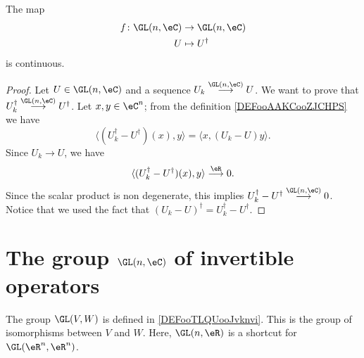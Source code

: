 \begin{lemma}        \label{LEMooZILJooFfDEAF}
	The map
	\begin{equation}
		\begin{aligned}
			f\colon \GL(n,\eC) & \to \GL(n,\eC)   \\
			U                  & \mapsto U^{\dag}
		\end{aligned}
	\end{equation}
	is continuous.
\end{lemma}

\begin{proof}
	Let \( U\in\GL(n,\eC)\) and a sequence \( U_k\stackrel{\GL(n,\eC)}{\longrightarrow}U\). We want to prove that \( U_k^{\dag}\stackrel{\GL(n,\eC)}{\longrightarrow}U^{\dag}\). Let \( x,y\in \eC^n\); from the definition \ref{DEFooAAKCooZJCHPS} we have
	\begin{equation}
		\langle (U_k^{\dag}-U^{\dag})(x),y \rangle =\langle x, (U_k-U)y \rangle .
	\end{equation}
	Since \( U_k\to U\), we have
	\begin{equation}
		\langle (U_k^{\dag}-U^{\dag})(x),y \rangle \stackrel{\eR}{\longrightarrow}0.
	\end{equation}
	Since the scalar product is non degenerate, this implies \( U_k^{\dag}-U^{\dag}\stackrel{\GL(n,\eC)}{\longrightarrow}0\). Notice that we used the fact that \( (U_k-U)^{\dag}=U_k^{\dag}-U^{\dag}\).
\end{proof}

\section{The group \texorpdfstring{$ \GL(n,\eC)$}{GLnC} of invertible operators}


The group \( \GL(V,W)\) is defined in \ref{DEFooTLQUooJvknvi}. This is the group of isomorphisms between \( V\) and \( W\). Here, \( \GL(n,\eR)\) is a shortcut for \( \GL(\eR^n, \eR^n)\).

